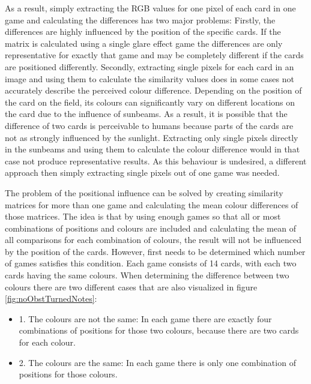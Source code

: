 As a result, simply extracting the RGB values for one pixel of each card in one game and calculating the differences has two major problems: Firstly, the differences are highly influenced by the position of the specific cards. If the matrix is calculated using a single glare effect game the differences are only representative for exactly that game and may be completely different if the cards are positioned differently. Secondly, extracting single pixels for each card in an image and using them to calculate the similarity values does in some cases not accurately describe the perceived colour difference. Depending on the position of the card on the field, its colours can significantly vary on different locations on the card due to the influence of sunbeams. As a result, it is possible that the difference of two cards is perceivable to humans because parts of the cards are not as strongly influenced by the sunlight. Extracting only single pixels directly in the sunbeams and using them to calculate the colour difference would in that case not produce representative results. As this behaviour is undesired, a different approach then simply extracting single pixels out of one game was needed. 

\newpage

The problem of the positional influence can be solved by creating similarity matrices for more than one game and calculating the mean colour differences of those matrices. The idea is that by using enough games so that all or most combinations of positions and colours are included and calculating the mean of all comparisons for each combination of colours, the result will not be influenced by the position of the cards. However, first needs to be determined which number of games satisfies this condition. Each game consists of 14 cards, with each two cards having the same colours. When determining the difference between two colours there are two different cases that are also visualized in figure \ref{fig:noObstTurnedNotes}: 
\begin{itemize}
	\item 1. The colours are not the same: In each game there are exactly four combinations of positions for those two colours, because there are two cards for each colour. 
	\item 2. The colours are the same: In each game there is only one combination of positions for those colours.  
\end{itemize}


